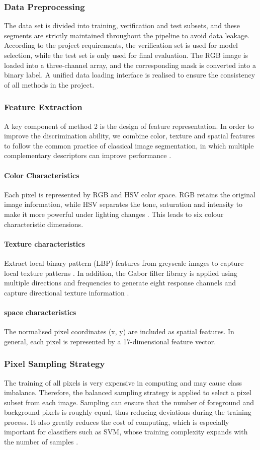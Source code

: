 \documentclass[conference]{IEEEtran}
\begin{document}
\subsubsection{Data Preprocessing}
The data set is divided into training, verification and test subsets, and these segments are strictly maintained throughout the pipeline to avoid data leakage. According to the project requirements, the verification set is used for model selection, while the test set is only used for final evaluation.
The RGB image is loaded into a three-channel array, and the corresponding mask is converted into a binary label. A unified data loading interface is realised to ensure the consistency of all methods in the project.
\subsubsection{Feature Extraction}
A key component of method 2 is the design of feature representation. In order to improve the discrimination ability, we combine color, texture and spatial features to follow the common practice of classical image segmentation, in which multiple complementary descriptors can improve performance \cite{lbp, svm}.
\paragraph{Color Characteristics}
Each pixel is represented by RGB and HSV color space. RGB retains the original image information, while HSV separates the tone, saturation and intensity to make it more powerful under lighting changes \cite{opencv}. This leads to six colour characteristic dimensions. 
\paragraph{Texture characteristics}
Extract local binary pattern (LBP) features from greyscale images to capture local texture patterns \cite{lbp}. In addition, the Gabor filter library is applied using multiple directions and frequencies to generate eight response channels and capture directional texture information \cite{gabor}.
\paragraph{space characteristics}
The normalised pixel coordinates (x, y) are included as spatial features. In general, each pixel is represented by a 17-dimensional feature vector.
\subsubsection{Pixel Sampling Strategy}
The training of all pixels is very expensive in computing and may cause class imbalance. Therefore, the balanced sampling strategy is applied to select a pixel subset from each image.
Sampling can ensure that the number of foreground and background pixels is roughly equal, thus reducing deviations during the training process. It also greatly reduces the cost of computing, which is especially important for classifiers such as SVM, whose training complexity expands with the number of samples \cite{sklearn}.
\end{document}
